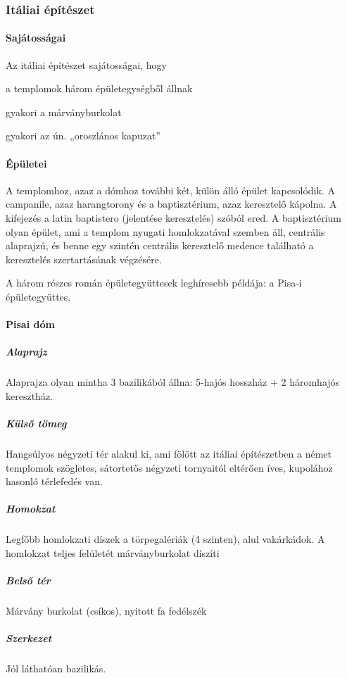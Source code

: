 	
	\subsubsection{Itáliai építészet}
	
	\paragraph{Sajátosságai}
	Az itáliai építészet sajátosságai, hogy
	\begin{compactitem}
		\item a templomok három épületegységből állnak
		\item gyakori a márványburkolat
		\item gyakori az ún. „oroszlános kapuzat”
	\end{compactitem}

	\paragraph{Épületei}
	A templomhoz, azaz a dómhoz további két, külön álló épület kapcsolódik. A campanile, azaz harangtorony és a baptisztérium, azaz keresztelő kápolna. A kifejezés a latin baptistero (jelentése keresztelés) szóból ered. A
	baptisztérium olyan épület, ami a templom nyugati
	homlokzatával szemben áll, centrális alaprajzú, és benne
	egy szintén centrális keresztelő medence található a
	keresztelés szertartásának végzésére.
	
	A három részes román épületegyüttesek leghíresebb példája:
	a Pisa-i épületegyüttes.
	
	\paragraph{Pisai dóm}
	
	\subparagraph{Alaprajz}
	Alaprajza olyan mintha 3 bazilikából állna: 5-hajós hosszház + 2 háromhajós
	keresztház.
	
	\subparagraph{Külső tömeg}
	Hangsúlyos négyzeti tér alakul ki, ami fölött az itáliai
	építészetben a német templomok szögletes, sátortetős négyzeti tornyaitól
	eltérően íves, kupolához hasonló térlefedés van.
	
	\subparagraph{Homokzat}
	Legfőbb homlokzati díszek a törpegalériák (4 szinten), alul
	vakárkádok. A homlokzat teljes felületét márványburkolat díszíti
	
	\subparagraph{Belső tér} Márvány burkolat (csíkos), nyitott fa fedélszék
	
	\subparagraph{Szerkezet} Jól láthatóan bazilikás.
	
